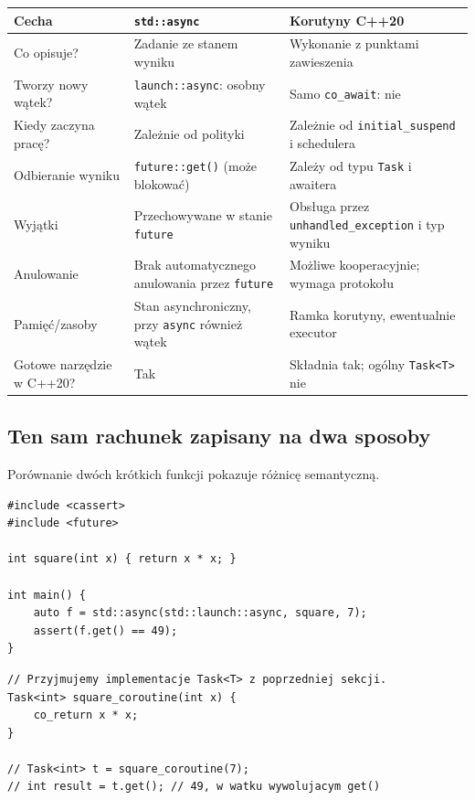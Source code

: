 \begin{center}
\small
\begin{tabularx}{\textwidth}{@{}lXX@{}}
\toprule
\textbf{Cecha} & \textbf{\texttt{std::async}} & \textbf{Korutyny C++20} \\
\midrule
Co opisuje? & Zadanie ze stanem wyniku & Wykonanie z punktami zawieszenia \\
Tworzy nowy wątek? & \texttt{launch::async}: osobny wątek & Samo \texttt{co\_await}: nie \\
Kiedy zaczyna pracę? & Zależnie od polityki & Zależnie od \texttt{initial\_suspend} i schedulera \\
Odbieranie wyniku & \texttt{future::get()} (może blokować) & Zależy od typu \texttt{Task} i awaitera \\
Wyjątki & Przechowywane w stanie \texttt{future} & Obsługa przez \texttt{unhandled\_exception} i typ wyniku \\
Anulowanie & Brak automatycznego anulowania przez \texttt{future} & Możliwe kooperacyjnie; wymaga protokołu \\
Pamięć/zasoby & Stan asynchroniczny, przy \texttt{async} również wątek & Ramka korutyny, ewentualnie executor \\
Gotowe narzędzie w C++20? & Tak & Składnia tak; ogólny \texttt{Task<T>} nie \\
\bottomrule
\end{tabularx}
\end{center}

\subsection{Ten sam rachunek zapisany na dwa sposoby}

Porównanie dwóch krótkich funkcji pokazuje różnicę semantyczną.

\begin{lstlisting}[caption={std::async uruchamia zadanie w odrębnym wątku (C++11); kompletny program.}]
#include <cassert>
#include <future>

int square(int x) { return x * x; }

int main() {
    auto f = std::async(std::launch::async, square, 7);
    assert(f.get() == 49);
}
\end{lstlisting}

\begin{lstlisting}[caption={Korutyna bez awaitera zewnętrznego nie tworzy wątku; fragment.}]
// Przyjmujemy implementacje Task<T> z poprzedniej sekcji.
Task<int> square_coroutine(int x) {
    co_return x * x;
}

// Task<int> t = square_coroutine(7);
// int result = t.get(); // 49, w watku wywolujacym get()
\end{lstlisting}

